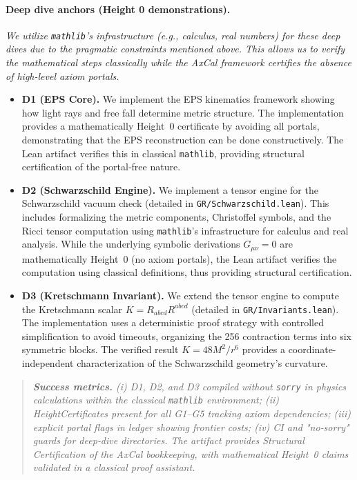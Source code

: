 \documentclass[11pt]{article}
\newenvironment{mdframed}[1][]{\begin{quote}\itshape}{\end{quote}}
\theoremstyle{definition}
\theoremstyle{remark}
\begin{document}
\paragraph{Deep dive anchors (Height 0 demonstrations).}
\emph{We utilize \texttt{mathlib}'s infrastructure (e.g., calculus, real numbers) for these deep dives due to the pragmatic constraints mentioned above. This allows us to verify the mathematical steps classically while the AxCal framework certifies the absence of high-level axiom portals.}
\begin{itemize}
\item \textbf{D1 (EPS Core).} We implement the EPS kinematics framework showing how light rays and free fall determine metric structure. The implementation provides a mathematically Height~0 certificate by avoiding all portals, demonstrating that the EPS reconstruction can be done constructively. The Lean artifact verifies this in classical \texttt{mathlib}, providing structural certification of the portal‑free nature.
\item \textbf{D2 (Schwarzschild Engine).} We implement a tensor engine for the Schwarzschild vacuum check (detailed in \texttt{GR/Schwarzschild.lean}). This includes formalizing the metric components, Christoffel symbols, and the Ricci tensor computation using \texttt{mathlib}'s infrastructure for calculus and real analysis. While the underlying symbolic derivations $G_{\mu\nu}=0$ are mathematically Height~0 (no axiom portals), the Lean artifact verifies the computation using classical definitions, thus providing structural certification.
\item \textbf{D3 (Kretschmann Invariant).} We extend the tensor engine to compute the Kretschmann scalar $K = R_{abcd}R^{abcd}$ (detailed in \texttt{GR/Invariants.lean}). The implementation uses a deterministic proof strategy with controlled simplification to avoid timeouts, organizing the 256 contraction terms into six symmetric blocks. The verified result $K = 48M^2/r^6$ provides a coordinate-independent characterization of the Schwarzschild geometry's curvature.
\end{itemize}

\begin{mdframed}[style=status]
\textbf{Success metrics.} (i) D1, D2, and D3 compiled without \texttt{sorry} in physics calculations within the classical \texttt{mathlib} environment; (ii) HeightCertificates present for all G1--G5 tracking axiom dependencies; (iii) explicit portal flags in ledger showing frontier costs; (iv) CI and "no‑sorry" guards for deep‑dive directories. The artifact provides \emph{Structural Certification} of the AxCal bookkeeping, with mathematical Height~0 claims validated in a classical proof assistant.
\end{mdframed}
\end{document}
